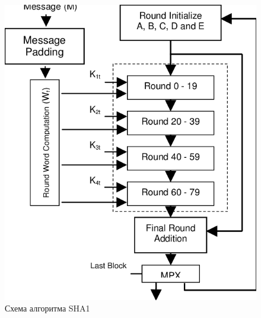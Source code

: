 \begin{figure}[ht!]
	\centering
	\includegraphics[width=0.8\linewidth]{images/sha_work.png}
	\caption{Схема алгоритма SHA1}
	\label{img:sha_work}
\end{figure}